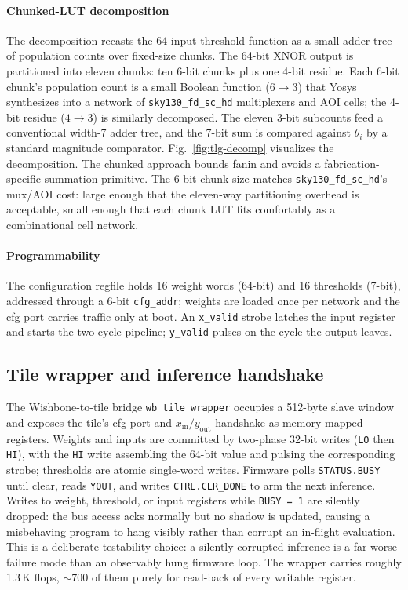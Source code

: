 \documentclass[conference]{IEEEtran}
\begin{document}
\paragraph{Chunked-LUT decomposition} The decomposition recasts
the 64-input threshold function as a small adder-tree of population
counts over fixed-size chunks. The 64-bit XNOR output is partitioned
into eleven chunks: ten 6-bit chunks plus one 4-bit residue.
Each 6-bit chunk's population count is a small Boolean function
($6 \to 3$) that Yosys synthesizes into a network of
\texttt{sky130\_fd\_sc\_hd} multiplexers and AOI cells; the 4-bit
residue ($4 \to 3$) is similarly decomposed. The eleven 3-bit
subcounts feed a conventional width-7 adder tree, and the 7-bit
sum is compared against \(\theta_i\) by a standard magnitude
comparator. Fig.~\ref{fig:tlg-decomp} visualizes the decomposition.
The chunked approach bounds fanin and avoids a fabrication-specific
summation primitive. The 6-bit chunk size matches
\texttt{sky130\_fd\_sc\_hd}'s mux/AOI cost: large enough that
the eleven-way partitioning overhead is acceptable, small enough
that each chunk LUT fits comfortably as a combinational cell
network.

\paragraph{Programmability} The configuration regfile holds 16 weight words (64-bit)
and 16 thresholds (7-bit), addressed through a 6-bit
\texttt{cfg\_addr}; weights are loaded once per network and the cfg
port carries traffic only at boot. An \texttt{x\_valid} strobe
latches the input register and starts the two-cycle pipeline;
\texttt{y\_valid} pulses on the cycle the output leaves.

\subsection{Tile wrapper and inference handshake}
\label{sec:arch:wrapper}

The Wishbone-to-tile bridge \texttt{wb\_tile\_wrapper} occupies a
512-byte slave window and exposes the tile's cfg port and
\(x_\text{in}/y_\text{out}\) handshake as memory-mapped registers.
Weights and inputs are committed by two-phase 32-bit writes
(\texttt{LO} then \texttt{HI}), with the \texttt{HI} write
assembling the 64-bit value and pulsing the corresponding strobe;
thresholds are atomic single-word writes. Firmware polls
\texttt{STATUS.BUSY} until clear, reads \texttt{YOUT}, and writes
\texttt{CTRL.CLR\_DONE} to arm the next inference. Writes to
weight, threshold, or input registers while \texttt{BUSY\,=\,1}
are silently dropped: the bus access acks normally but no shadow
is updated, causing a misbehaving program to hang visibly rather
than corrupt an in-flight evaluation. This is a deliberate
testability choice: a silently corrupted inference is a far worse
failure mode than an observably hung firmware loop. The wrapper
carries roughly 1.3\,K flops, $\sim$700 of them purely for read-back of
every writable register.
\end{document}
